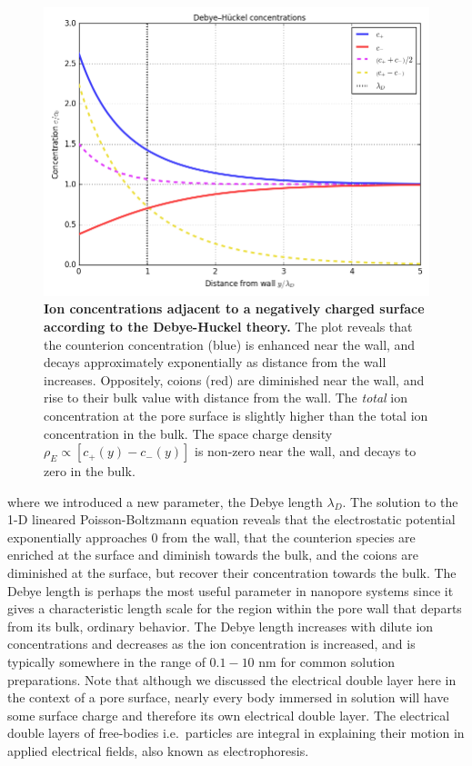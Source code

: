 			\begin{figure}
				\includegraphics[width=\textwidth]{EDL_Charge_Distribution.png}
				\caption{\textbf{Ion concentrations adjacent to a negatively charged surface according to the Debye-Huckel theory.} The plot reveals that the counterion concentration (blue) is enhanced near the wall, and decays approximately exponentially as distance from the wall increases. Oppositely, coions (red) are diminished near the wall, and rise to their bulk value with distance from the wall. The \textit{total} ion concentration at the pore surface is slightly higher than the total ion concentration in the bulk. The space charge density $\rho_{E}\propto\left[c_{+}\left(y\right)-c_{-}\left(y\right)\right]$ is non-zero near the wall, and decays to zero in the bulk.}
				\label{fig:EDLChargeDistribution}
			\end{figure}

			
			where we introduced a new parameter, the Debye length $\lambda_{D}$. The solution to the 1-D lineared Poisson-Boltzmann equation reveals that the electrostatic potential exponentially approaches 0 from the wall, that the counterion species are enriched at the surface and diminish towards the bulk, and the coions are diminished at the surface, but recover their concentration towards the bulk. The Debye length is perhaps the most useful parameter in nanopore systems since it gives a characteristic length scale for the region within the pore wall that departs from its bulk, ordinary behavior. The Debye length increases with dilute ion concentrations and decreases as the ion concentration is increased, and is typically somewhere in the range of $0.1-10$ nm for common solution preparations. Note that although we discussed the electrical double layer here in the context of a pore surface, nearly every body immersed in solution will have some surface charge and therefore its own electrical double layer. The electrical double layers of free-bodies i.e.~particles are integral in explaining their motion in applied electrical fields, also known as electrophoresis. 
			
